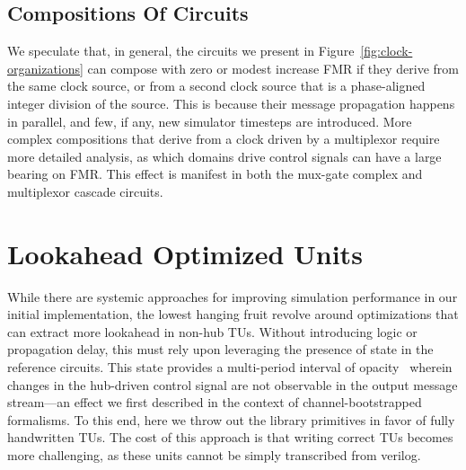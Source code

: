 \subsection{Compositions Of Circuits}

We speculate that, in general, the circuits we present in
Figure~\ref{fig:clock-organizations} can compose with zero or modest increase
FMR if they derive from the same clock source, or from a second clock source
that is a phase-aligned integer division of the source. This is because their
message propagation happens in parallel, and few, if any, new simulator
timesteps are introduced. More complex compositions that derive from a clock
driven by a multiplexor require more detailed analysis, as which domains
drive control signals can have a large bearing on FMR. This effect is manifest
in both the mux-gate complex and multiplexor cascade circuits.

\section{Lookahead Optimized Units}\label{sec:pdes-opt-units}
While there are systemic approaches for improving simulation performance in our
initial implementation, the lowest hanging fruit revolve around optimizations
that can extract more lookahead in non-hub TUs. Without introducing logic or
propagation delay, this must rely upon leveraging the presence of state in the
reference circuits. This state provides a multi-period interval of
opacity~\cite{ImplicitLookahead2} wherein changes in the hub-driven control
signal are not observable in the output message stream---an effect we first
described in the context of channel-bootstrapped formalisms.
To this end, here we throw out the library primitives in favor of fully handwritten TUs.
The cost of this approach is that writing correct TUs becomes more challenging,
as these units cannot be simply transcribed from verilog.

